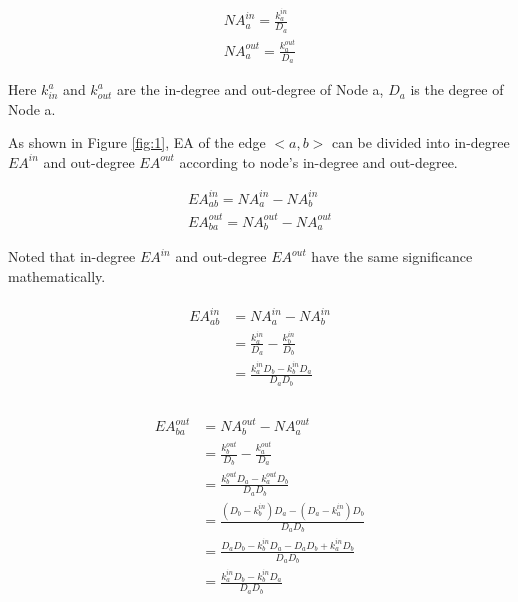\documentclass[aps,prl,twocolumn,showpacs,superscriptaddress,groupedaddress]{revtex4}  %
\begin{document}
\setlength{\abovedisplayskip}{1pt}
\begin{eqnarray}
{NA}_{a}^{in} = \frac{k_{a}^{in}}{D_{a}}\\
{NA}_{a}^{out} = \frac{k_{a}^{out}}{D_{a}}
\end{eqnarray}
\setlength{\belowdisplayskip}{1pt}

Here $k_{in}^{a}$ and $k_{out}^{a}$ are the in-degree and out-degree of Node a, $D_{a}$ is the degree of Node a.

As shown in Figure \ref{fig:1}, EA of the edge $<a, b>$ can be divided into in-degree $EA^{in}$ and out-degree $EA^{out}$ according to node's in-degree and out-degree.

\setlength{\abovedisplayskip}{1pt}
\begin{eqnarray}
EA_{ab}^{in}=NA_{a}^{in}- NA_{b}^{in}\\
EA_{ba}^{out}=NA_{b}^{out}- NA_{a}^{out}
\end{eqnarray}
\setlength{\belowdisplayskip}{1pt}

Noted that in-degree $EA^{in}$ and out-degree $EA^{out}$ have the same significance mathematically.

\setlength{\abovedisplayskip}{1pt}
\begin{eqnarray}
\begin{aligned}
EA_{ab}^{in}&=NA_{a}^{in}- NA_{b}^{in}\\
&=\frac{k_{a}^{in}}{D_{a}}-\frac{k_{b}^{in}}{D_{b}}\\
&=\frac{k_{a}^{in}D_{b}-k_{b}^{in}D_{a}}{D_{a}D_{b}}\\
\end{aligned}
\end{eqnarray}
\setlength{\belowdisplayskip}{1pt}

\setlength{\abovedisplayskip}{1pt}
\begin{eqnarray}
\begin{aligned}
EA_{ba}^{out}&=NA_{b}^{out}- NA_{a}^{out}\\
&=\frac{k_{b}^{out}}{D_{b}}-\frac{k_{a}^{out}}{D_{a}}\\
&=\frac{k_{b}^{out}D_{a}-k_{a}^{out}D_{b}}{D_{a}D_{b}}\\
&=\frac{(D_{b}-k_{b}^{in})D_{a}-(D_{a}-k_{a}^{in})D_{b}}{D_{a}D_{b}}\\
&=\frac{D_{a}D_{b}-k_{b}^{in}D_{a}-D_{a}D_{b}+k_{a}^{in}D_{b}}{D_{a}D_{b}}\\
&=\frac{k_{a}^{in}D_{b}-k_{b}^{in}D_{a}}{D_{a}D_{b}}\\
\end{aligned}
\end{eqnarray}
\setlength{\belowdisplayskip}{1pt}
\end{document}
